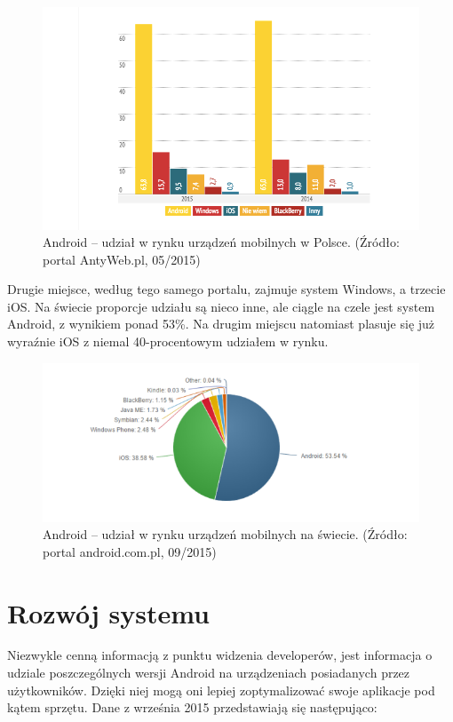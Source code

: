 \begin{figure}[!htb]
    \centering
    \includegraphics[width=15cm]{imgs/ch2_android_udzial_1.png}
    \caption
{Android – udział w rynku urządzeń mobilnych w Polsce. (Źródło: portal AntyWeb.pl, 05/2015)}
    \label{fig:android_udzial_polska}
\end{figure} 

Drugie miejsce, według tego samego portalu, zajmuje system Windows, a trzecie iOS. Na świecie proporcje udziału są nieco inne, ale ciągle na czele jest system Android, z wynikiem ponad 53\%. Na drugim miejscu natomiast plasuje się już wyraźnie iOS z niemal 40-procentowym udziałem w rynku.

\begin{figure}[!htb]
    \centering
    \includegraphics[width=17cm]{imgs/ch2_android_udzial_2.png}
    \caption
{Android – udział w rynku urządzeń mobilnych na świecie. (Źródło: portal android.com.pl, 09/2015)}
    \label{fig:android_udzial_zagranica}
\end{figure} 

\section{Rozwój systemu}
Niezwykle cenną informacją z punktu widzenia developerów, jest informacja o udziale poszczególnych wersji Android na urządzeniach posiadanych przez użytkowników. Dzięki niej mogą oni lepiej zoptymalizować swoje aplikacje pod kątem sprzętu. Dane z września 2015 przedstawiają się następująco:

